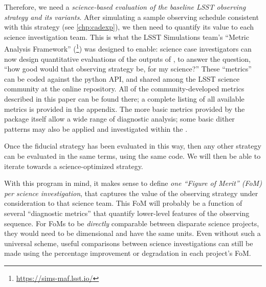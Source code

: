 Therefore, we need a {\it science-based evaluation of the baseline LSST
observing strategy and its variants}. After simulating a sample
observing schedule consistent with this strategy (see
\autoref{chp:cadexp}), we then need to quantify its value to each
science investigation team.  This is what the LSST Simulations team's ``Metric
Analysis Framework'' (\MAF\footnote{\url{https://sims-maf.lsst.io/}}) was designed to enable: science case investigators
can now design quantitative evaluations of the outputs of \OpSim, to
answer the question, ``how good would that observing strategy be, for my
science?'' These ``metrics'' can be coded against the \MAF python API, and
shared among the LSST science community at the
\href{https://sims-maf.lsst.io/metricList.html#contributed-mafcontrib-metrics}{\simsMafContrib}
online repository.
All of the community-developed \MAF metrics described in this paper can be found there; a complete listing of all available \MAF metrics is provided in the appendix. The more basic metrics provided by the \MAF package itself allow a wide range of diagnostic analysis; some basic dither patterns may also be applied and investigated within the \MAF.

Once the fiducial strategy has
been evaluated in this way, then any other strategy can be evaluated
in the same terms, using the same code.  We will then be able to iterate towards a
science-optimized strategy.

With this program in mind, it makes sense to define {\it one ``Figure
of Merit'' (FoM) per science investigation}, that captures the value of  the
observing strategy under consideration to that science team. This FoM
will probably be a function of several ``diagnostic metrics'' that quantify
lower-level features of the observing sequence.  For FoMs
to be {\it directly} comparable between disparate science projects,  they would
need to be dimensional and have the same units. Even without such a universal scheme, useful comparisons between science investigations can still be made using the percentage improvement or degradation in each project's FoM.

